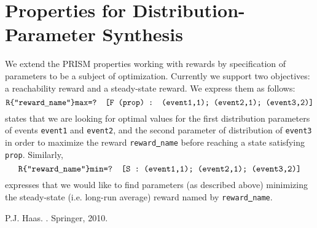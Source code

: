 \documentclass{article}
\newcommand{\eqdef}{\ensuremath{\stackrel{\text{\tiny def}}{=}}}
\renewcommand{\_}{\underline{~}}
\newcommand{\code}[1]{\texttt{#1}}
\begin{document}
%
%
%
%
%

\section*{Properties for Distribution-Parameter Synthesis}

We extend the PRISM properties working with rewards by specification of parameters to be a subject of optimization. Currently we support two objectives: a reachability reward and a steady-state reward. We express them as follows:
$$\code{R\{"reward\_name"\}max=? [F (prop) : (event1,1); (event2,1); (event3,2)]}$$ 
states that we are looking for optimal values for the first distribution parameters of events \code{event1} and \code{event2}, and the second parameter of distribution of \code{event3} in order to  maximize the reward \code{reward\_name} before reaching a state satisfying \code{prop}. Similarly,
$$\code{R\{"reward\_name"\}min=? [S : (event1,1); (event2,1); (event3,2)]}$$ 
expresses that we would like to find parameters (as described above) minimizing the steady-state (i.e. long-run average) reward named by \code{reward\_name}.


\begin{thebibliography}{1}
P.J. Haas.
.
\newblock Springer, 2010.
\end{thebibliography}
\end{document}

